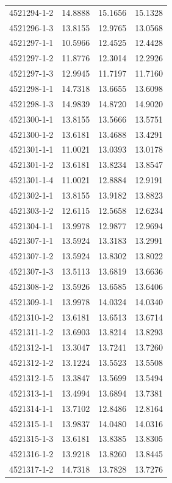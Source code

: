 \begin{longtable}{lrrr}
4521294-1-2 & 14.8888 & 15.1656 & 15.1328 \\
4521296-1-3 & 13.8155 & 12.9765 & 13.0568 \\
4521297-1-1 & 10.5966 & 12.4525 & 12.4428 \\
4521297-1-2 & 11.8776 & 12.3014 & 12.2926 \\
4521297-1-3 & 12.9945 & 11.7197 & 11.7160 \\
4521298-1-1 & 14.7318 & 13.6655 & 13.6098 \\
4521298-1-3 & 14.9839 & 14.8720 & 14.9020 \\
4521300-1-1 & 13.8155 & 13.5666 & 13.5751 \\
4521300-1-2 & 13.6181 & 13.4688 & 13.4291 \\
4521301-1-1 & 11.0021 & 13.0393 & 13.0178 \\
4521301-1-2 & 13.6181 & 13.8234 & 13.8547 \\
4521301-1-4 & 11.0021 & 12.8884 & 12.9191 \\
4521302-1-1 & 13.8155 & 13.9182 & 13.8823 \\
4521303-1-2 & 12.6115 & 12.5658 & 12.6234 \\
4521304-1-1 & 13.9978 & 12.9877 & 12.9694 \\
4521307-1-1 & 13.5924 & 13.3183 & 13.2991 \\
4521307-1-2 & 13.5924 & 13.8302 & 13.8022 \\
4521307-1-3 & 13.5113 & 13.6819 & 13.6636 \\
4521308-1-2 & 13.5926 & 13.6585 & 13.6406 \\
4521309-1-1 & 13.9978 & 14.0324 & 14.0340 \\
4521310-1-2 & 13.6181 & 13.6513 & 13.6714 \\
4521311-1-2 & 13.6903 & 13.8214 & 13.8293 \\
4521312-1-1 & 13.3047 & 13.7241 & 13.7260 \\
4521312-1-2 & 13.1224 & 13.5523 & 13.5508 \\
4521312-1-5 & 13.3847 & 13.5699 & 13.5494 \\
4521313-1-1 & 13.4994 & 13.6894 & 13.7381 \\
4521314-1-1 & 13.7102 & 12.8486 & 12.8164 \\
4521315-1-1 & 13.9837 & 14.0480 & 14.0316 \\
4521315-1-3 & 13.6181 & 13.8385 & 13.8305 \\
4521316-1-2 & 13.9218 & 13.8260 & 13.8445 \\
4521317-1-2 & 14.7318 & 13.7828 & 13.7276 \\

\end{longtable}
